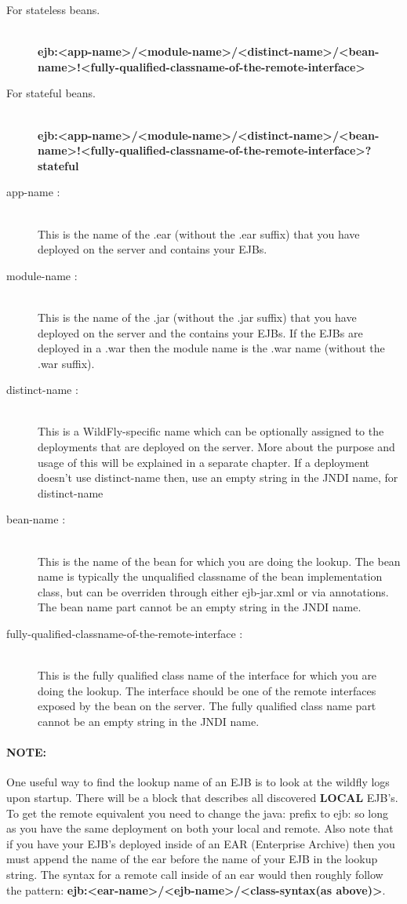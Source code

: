 \documentclass[
10pt, %
letterpaper, %
oneside, %
headinclude,footinclude, %
BCOR5mm, %
]{scrartcl}
\begin{document}
\begin{description}
\item[For stateless beans.] \hfill \\
\textbf{
ejb:<app-name>/<module-name>/<distinct-name>/<bean-name>!<fully-qualified-classname-of-the-remote-interface>}
\item[For stateful beans.] \hfill \\
\textbf{
ejb:<app-name>/<module-name>/<distinct-name>/<bean-name>!<fully-qualified-classname-of-the-remote-interface>?stateful}
\item[app-name :] \hfill \\
This is the name of the .ear (without the .ear suffix) that you have deployed on the server and contains your EJBs.
\item[module-name :] \hfill \\
This is the name of the .jar (without the .jar suffix) that you have deployed on the server and the contains your EJBs. If the EJBs are deployed in a .war then the module name is the .war name (without the .war suffix).
\item[distinct-name :] \hfill \\
This is a WildFly-specific name which can be optionally assigned to the deployments that are deployed on the server. More about the purpose and usage of this will be explained in a separate chapter. If a deployment doesn't use distinct-name then, use an empty string in the JNDI name, for distinct-name
\item[bean-name :] \hfill \\
This is the name of the bean for which you are doing the lookup. The bean name is typically the unqualified classname of the bean implementation class, but can be overriden through either ejb-jar.xml or via annotations. The bean name part cannot be an empty string in the JNDI name.
\item[fully-qualified-classname-of-the-remote-interface :] \hfill \\
This is the fully qualified class name of the interface for which you are doing the lookup. The interface should be one of the remote interfaces exposed by the bean on the server. The fully qualified class name part cannot be an empty string in the JNDI name.
\end{description}

\paragraph{\textbf{NOTE:}} One useful way to find the lookup name of an EJB is to look at the wildfly logs upon startup. There will be a block that describes all discovered \textbf{LOCAL} EJB's. To get the remote equivalent you need to change the java: prefix to ejb: so long as you have the same deployment on both your local and remote. Also note that if you have your EJB's deployed inside of an EAR (Enterprise Archive) then you must append the name of the ear before the name of your EJB in the lookup string. The syntax for a remote call inside of an ear would then roughly follow the pattern: \textbf{ejb:<ear-name>/<ejb-name>/<class-syntax(as above)>}.
\end{document}
